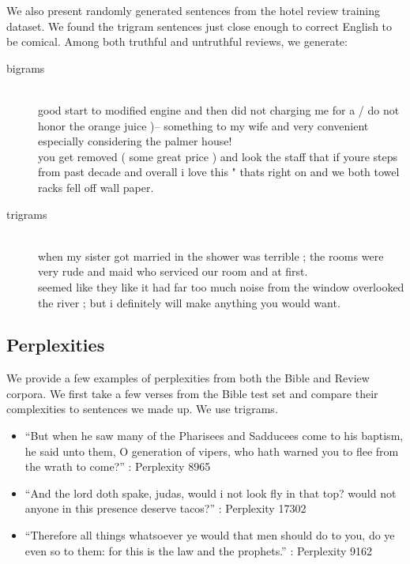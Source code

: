 \documentclass[12pt]{article}
\begin{document}
We also present randomly generated sentences from the hotel review training dataset. We found the trigram sentences just close enough to correct English to be comical. Among both truthful and untruthful reviews, we generate:
\begin{description}
\item[bigrams]\hfill\\
good start to modified engine and then did not charging me for a / do not honor the orange juice )-- something to my wife and very convenient especially considering the palmer house!
\\
you get removed ( some great price ) and look the staff that if youre steps from past decade and overall i love this " thats right on and we both towel racks fell off wall paper.
\item[trigrams]\hfill\\
when my sister got married in the shower was terrible ; the rooms were very rude and maid who serviced our room and at first.
\\
seemed like they like it had far too much noise from the window overlooked the river ; but i definitely will make anything you would want.
\end{description}

\subsection{Perplexities}
We provide a few examples of perplexities from both the Bible and Review corpora. We first take a few verses from the Bible test set and compare their complexities to sentences we made up. We use trigrams.
\begin{itemize}
\item ``But when he saw many of the Pharisees and Sadducees come to his
baptism, he said unto them, O generation of vipers, who hath warned
you to flee from the wrath to come?'' : Perplexity 8965

\item ``And the lord doth spake, judas, would i not look fly in that top? would not anyone in this presence deserve tacos?'' : Perplexity 17302
			
\item ``Therefore all things
whatsoever ye would that men should do to you, do ye even so to them:
for this is the law and the prophets.'' : Perplexity 9162
\end{itemize}
\end{document}
